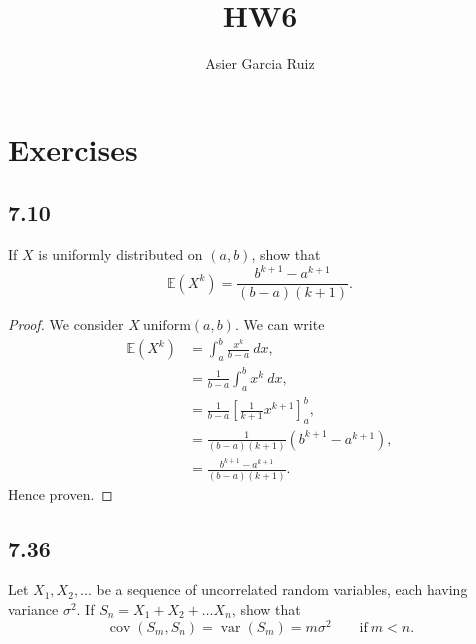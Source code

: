 \documentclass{article}
\title{HW6}
\author{Asier Garcia Ruiz }
\newcommand{\E}[1]{\mathbb{E}(#1)}
\DeclareMathOperator{\cov}{cov}
\DeclareMathOperator{\var}{var}
\begin{document}
\maketitle

\section*{Exercises}
\subsection*{7.10}
If $X$ is uniformly distributed on $(a,b)$, show that
\begin{equation*}
    \E{X^k} = \frac{b^{k+1}-a^{k+1}}{(b-a)(k+1)}.
\end{equation*}

\begin{proof}
    We consider $X ~ \text{uniform}(a,b)$. We can write
    \begin{align*}
        \E{X^k} & = \int_a^b \frac{x^k}{b-a} \ dx,            \\
                & = \frac{1}{b-a}\int_a^b x^k \ dx,           \\
                & = \frac{1}{b-a} [\frac{1}{k+1}x^{k+1}]_a^b, \\
                & = \frac{1}{(b-a)(k+1)}(b^{k+1} - a^{k+1}),  \\
                & = \frac{b^{k+1}-a^{k+1}}{(b-a)(k+1)}.
    \end{align*}
    Hence proven.
\end{proof}

\subsection*{7.36}
Let $X_1, X_2, ...$ be a sequence of uncorrelated random variables, each having variance
$\sigma^2$. If $S_n = X_1 + X_2 + \dots X_n$, show that
\begin{equation*}
    \cov(S_m, S_n) = \var(S_m) = m\sigma^2 \qquad \text{if} \ m < n.
\end{equation*}
\end{document}
